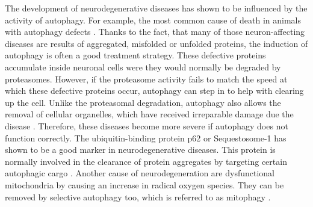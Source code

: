 \documentclass[12pt]{article} %
\begin{document}
\begin{linenumbers*}
The development of neurodegenerative diseases has shown to be influenced by the activity of autophagy. For example, the most common cause of death in animals with autophagy defects \citep{Dikic2018}. Thanks to the fact, that many of those neuron-affecting diseases are results of aggregated, misfolded or unfolded proteins, the induction of autophagy is often a good treatment strategy. These defective proteins accumulate inside neuronal cells were they would normally be degraded by proteasomes. However, if the proteasome activity fails to match the speed at which these defective proteins occur, autophagy can step in to help with clearing up the cell. Unlike the proteasomal degradation, autophagy also allows the removal of cellular organelles, which have received irreparable damage due the disease \citep{Dikic2018}. Therefore, these diseases become more severe if autophagy does not function correctly.
The ubiquitin-binding protein p62 or Sequestosome-1 has shown to be a good marker in neurodegenerative diseases. This protein is normally involved in the clearance of protein aggregates by targeting certain autophagic cargo \citep{Dikic2018, Rusten2010}.
Another cause of neurodegeneration are dysfunctional mitochondria by causing an increase in radical oxygen species. They can be removed by selective autophagy too, which is referred to as mitophagy \citep{Dikic2018}.



\end{linenumbers*}
\end{document}
